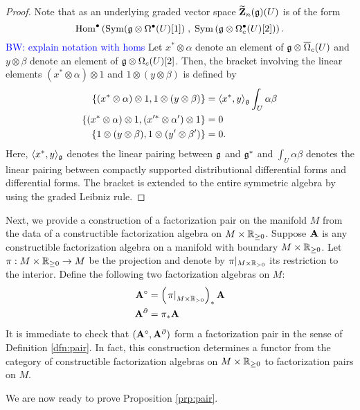 \documentclass[11pt]{amsart}
\numberwithin{equation}{section}
\def\brian{\textcolor{blue}{BW: }\textcolor{blue}}
\begin{document}
\begin{proof}
Note that as an underlying graded vector space $\widetilde{\mathbf Z}_n(\mathfrak g) (U)$ is of the form
\[
{\rm Hom}^\bullet\left({\rm Sym}(\mathfrak g \otimes \Omega^\bullet (U)[1]) \; , \; {\rm Sym}  \left(\mathfrak g \otimes \Omega^\bullet_c(U) [2] \right) \right)  .
\]
\brian{explain notation with homs} 
Let $x^* \otimes \alpha$ denote an element of $\mathfrak g \otimes \overline{\Omega}_c (U)$ and $y \otimes \beta$ denote an element of $\mathfrak g \otimes \Omega_c(U) [2]$. 
Then, the bracket involving the linear elements $(x^* \otimes \alpha) \otimes 1$ 
and $1 \otimes (y \otimes \beta)$ is defined by
\begin{align*}
\{(x^* \otimes \alpha) \otimes 1 , 1 \otimes (y \otimes \beta)\} & = \langle x^*, y\rangle_\mathfrak g \int_U \alpha \beta \\
\{(x^* \otimes \alpha) \otimes 1 , (x'^* \otimes \alpha') \otimes 1\} & = 0 \\
\{1 \otimes (y \otimes \beta) , 1 \otimes (y' \otimes \beta')\} & = 0 . 
\end{align*}
Here, $\langle x^*, y\rangle_\mathfrak g$ denotes the linear pairing between $\mathfrak g$ and $\mathfrak g^*$ and $\int_U\alpha \beta$ denotes the linear pairing between compactly supported distributional differential forms and differential forms. 
The bracket is extended to the entire symmetric algebra by using the graded Leibniz rule.
\end{proof}

Next, we provide a construction of a factorization pair on the manifold $M$ from the data of a constructible factorization algebra on $M \times \mathbb R_{\geq 0}$. 
Suppose $\mathbf A$ is any constructible factorization algebra on a manifold with boundary $M \times \mathbb R_{\geq 0}$. 
Let $\pi : M \times \mathbb R_{\geq 0} \to M$ be the projection and denote by $\pi|_{M \times \mathbb R_{>0}}$ its restriction to the interior. 
Define the following two factorization algebras on $M$:
\begin{align*}
\mathbf A^\circ & = \left(\left.\pi\right|_{M \times \mathbb R_{>0}} \right)_* \mathbf A \\
\mathbf A^\partial & = \pi_* \mathbf A
\end{align*}
It is immediate to check that $(\mathbf A^\circ, \mathbf A^\partial)$ form a factorization pair in the sense of Definition \ref{dfn:pair}. 
In fact, this construction determines a functor from the category of constructible factorization algebras on $M \times \mathbb R_{\geq 0}$ to factorization pairs on $M$.

We are now ready to prove Proposition \ref{prp:pair}.
\end{document}
